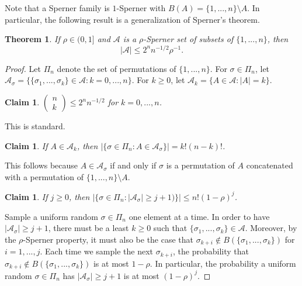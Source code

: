 \documentclass{amsart}
\newtheorem{theorem}[equation]{Theorem}
\newtheorem{claim}[equation]{Claim}
\numberwithin{equation}{section}
\numberwithin{figure}{section}
\begin{document}
Note that a Sperner family is $1$-Sperner with $B(A) = \{ 1, ..., n \} \setminus A$.  In particular, the following result is a generalization of Sperner's theorem.

\begin{theorem}
\label{t.sperner}
If $\rho \in (0,1]$ and $\mathcal A$ is a $\rho$-Sperner set of subsets of $\{ 1, ..., n \}$, then
\begin{equation*}
|\mathcal A| \leq 2^n n^{-1/2} \rho^{-1}.
\end{equation*}
\end{theorem}

\begin{proof}
Let $\Pi_n$ denote the set of permutations of $\{ 1, ..., n \}$.  For $\sigma \in \Pi_n$, let $\mathcal A_\sigma = \{ \{ \sigma_1, ..., \sigma_k \} \in \mathcal A : k = 0, ..., n \}$.      For $k \geq 0$, let $\mathcal A_k = \{ A \in \mathcal A : |A| = k \}$.

\begin{claim}
$\left(\begin{smallmatrix} n \\ k \end{smallmatrix} \right) \leq 2^n n^{-1/2}$ for $k = 0, ..., n$.
\end{claim}

This is standard.	

\begin{claim}
If $A \in \mathcal A_k$, then $|\{ \sigma \in \Pi_n : A \in \mathcal A_\sigma \}| = k! (n-k)!$.
\end{claim}

This follows because $A \in \mathcal A_\sigma$ if and only if $\sigma$ is a permutation of $A$ concatenated with a permutation of $\{ 1, ..., n \} \setminus A$.

\begin{claim}
If $j \geq 0$, then $|\{ \sigma \in \Pi_n : |\mathcal A_\sigma| \geq j + 1)\}| \leq n! (1 - \rho)^j$.
\end{claim}

Sample a uniform random $\sigma \in \Pi_n$ one element at a time.  In order to have $|\mathcal A_\sigma| \geq j + 1$, there must be a least $k \geq 0$ such that $\{ \sigma_1, ..., \sigma_k \} \in \mathcal A$.  Moreover, by the $\rho$-Sperner property, it must also be the case that $\sigma_{k+i} \notin B(\{ \sigma_1, ..., \sigma_k\})$ for $i = 1, ..., j$.  Each time we sample the next $\sigma_{k+i}$, the probability that $\sigma_{k+i} \notin B(\{ \sigma_1, ..., \sigma_k\})$ is at most $1-\rho$.  In particular, the probability a uniform random $\sigma \in \Pi_n$ has $|\mathcal A_\sigma| \geq j + 1$ is at most $(1-\rho)^j$.


\end{proof}
\end{document}
